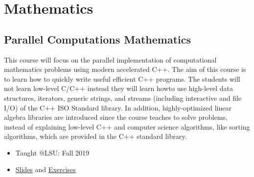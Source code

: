 \documentclass[11pt,a4paper]{article}
\begin{document}
\section*{Mathematics}

\subsection*{Parallel Computations Mathematics}

This course will focus on the parallel implementation of computational mathematics problems using modern accelerated C++. The aim of this course is to learn how to quickly write useful efficient C++ programs. The students will not learn low-level C/C++ instead they will learn howto use high-level data structures, iterators, generic strings, and streams (including interactive and file I/O) of the C++ ISO Standard library. In addition, highly-optimized linear algebra libraries are introduced since the course teaches to solve problems, instead of explaining low-level C++ and computer science algorithms, like sorting algorithms, which are provided in the C++ standard library.
\begin{itemize}
\item Taught @LSU: Fall 2019
\item \href{https://github.com/diehlpkteaching/ParallelComputationMath}{Slides} and \href{https://github.com/diehlpkteaching/ParallelComputationMathExercise}{Exercises}
\end{itemize}

\label{LastPage}             
\end{document}
